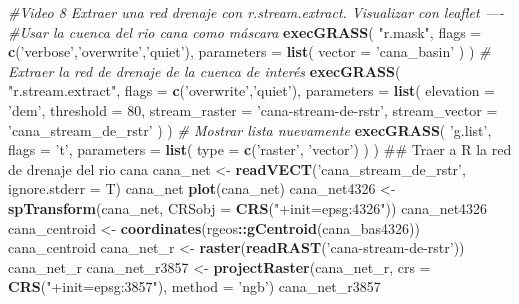 \documentclass[11pt,]{article}
\newenvironment{Shaded}{\begin{snugshade}}{\end{snugshade}}
\newcommand{\KeywordTok}[1]{\textcolor[rgb]{0.13,0.29,0.53}{\textbf{#1}}}
\newcommand{\DataTypeTok}[1]{\textcolor[rgb]{0.13,0.29,0.53}{#1}}
\newcommand{\DecValTok}[1]{\textcolor[rgb]{0.00,0.00,0.81}{#1}}
\newcommand{\StringTok}[1]{\textcolor[rgb]{0.31,0.60,0.02}{#1}}
\newcommand{\CommentTok}[1]{\textcolor[rgb]{0.56,0.35,0.01}{\textit{#1}}}
\newcommand{\OperatorTok}[1]{\textcolor[rgb]{0.81,0.36,0.00}{\textbf{#1}}}
\newcommand{\NormalTok}[1]{#1}
\begin{document}
\begin{Shaded}
\begin{Highlighting}[]
{{{{\CommentTok{#Video 8 Extraer una red drenaje con r.stream.extract. Visualizar con leaflet ----}
\CommentTok{#Usar la cuenca del rio cana como máscara}
\KeywordTok{execGRASS}\NormalTok{(}
  \StringTok{"r.mask"}\NormalTok{,}
  \DataTypeTok{flags =} \KeywordTok{c}\NormalTok{(}\StringTok{'verbose'}\NormalTok{,}\StringTok{'overwrite'}\NormalTok{,}\StringTok{'quiet'}\NormalTok{),}
  \DataTypeTok{parameters =} \KeywordTok{list}\NormalTok{(}
    \DataTypeTok{vector =} \StringTok{'cana_basin'}
\NormalTok{  )}
\NormalTok{)}
\CommentTok{# Extraer la red de drenaje de la cuenca de interés}
\KeywordTok{execGRASS}\NormalTok{(}
  \StringTok{"r.stream.extract"}\NormalTok{,}
  \DataTypeTok{flags =} \KeywordTok{c}\NormalTok{(}\StringTok{'overwrite'}\NormalTok{,}\StringTok{'quiet'}\NormalTok{),}
  \DataTypeTok{parameters =} \KeywordTok{list}\NormalTok{(}
    \DataTypeTok{elevation =} \StringTok{'dem'}\NormalTok{,}
    \DataTypeTok{threshold =} \DecValTok{80}\NormalTok{,}
    \DataTypeTok{stream_raster =} \StringTok{'cana-stream-de-rstr'}\NormalTok{,}
    \DataTypeTok{stream_vector =} \StringTok{'cana_stream_de_rstr'}
\NormalTok{  )}
\NormalTok{)}
\CommentTok{# Mostrar lista nuevamente}
\KeywordTok{execGRASS}\NormalTok{(}
  \StringTok{'g.list'}\NormalTok{,}
  \DataTypeTok{flags =} \StringTok{'t'}\NormalTok{,}
  \DataTypeTok{parameters =} \KeywordTok{list}\NormalTok{(}
    \DataTypeTok{type =} \KeywordTok{c}\NormalTok{(}\StringTok{'raster'}\NormalTok{, }\StringTok{'vector'}\NormalTok{)}
\NormalTok{  )}
\NormalTok{)}
\NormalTok{## Traer a R la red de drenaje del rio cana}
\NormalTok{cana_net <-}\StringTok{ }\KeywordTok{readVECT}\NormalTok{(}\StringTok{'cana_stream_de_rstr'}\NormalTok{, }\DataTypeTok{ignore.stderr =}\NormalTok{ T)}
\NormalTok{cana_net}
\KeywordTok{plot}\NormalTok{(cana_net)}
\NormalTok{cana_net4326 <-}\StringTok{ }\KeywordTok{spTransform}\NormalTok{(cana_net, }\DataTypeTok{CRSobj =} \KeywordTok{CRS}\NormalTok{(}\StringTok{"+init=epsg:4326"}\NormalTok{))}
\NormalTok{cana_net4326}
\NormalTok{cana_centroid <-}\StringTok{ }\KeywordTok{coordinates}\NormalTok{(rgeos}\OperatorTok{::}\KeywordTok{gCentroid}\NormalTok{(cana_bas4326))}
\NormalTok{cana_centroid}
\NormalTok{cana_net_r <-}\StringTok{ }\KeywordTok{raster}\NormalTok{(}\KeywordTok{readRAST}\NormalTok{(}\StringTok{'cana-stream-de-rstr'}\NormalTok{))}
\NormalTok{cana_net_r}
\NormalTok{cana_net_r3857 <-}\StringTok{ }\KeywordTok{projectRaster}\NormalTok{(cana_net_r, }\DataTypeTok{crs =} \KeywordTok{CRS}\NormalTok{(}\StringTok{"+init=epsg:3857"}\NormalTok{), }\DataTypeTok{method =} \StringTok{'ngb'}\NormalTok{)}
\NormalTok{cana_net_r3857}
}}}}
\end{Highlighting}
\end{Shaded}
\end{document}
